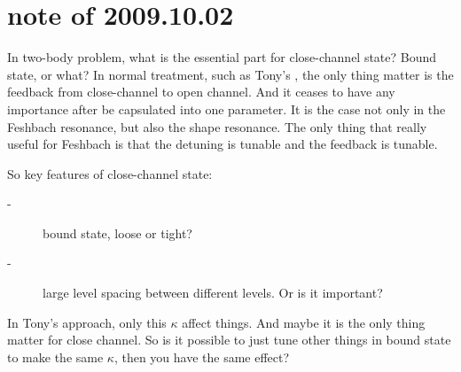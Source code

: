 \section{note of 2009.10.02}
In two-body problem, what is the essential part for close-channel state?  Bound state, or what?  In normal treatment, such as Tony's \cite{Leggett}, the only thing matter is the feedback from close-channel to open channel.  And it ceases to have any importance after be capsulated into one parameter.  It is the case not only in the Feshbach resonance, but also the shape resonance.  The only thing that really useful for Feshbach is that the detuning is tunable and the feedback is tunable. 

So key features of close-channel state:
\begin{description}
	\item[-]bound state, loose or tight?
	\item[-]large level spacing between different levels. Or is it important?
	
\end{description}

In Tony's approach, only this $\kappa$ affect things. And maybe it is the only thing matter for close channel.  So is it possible to just tune other things in bound state to make the same $\kappa$, then you have the same effect?  
